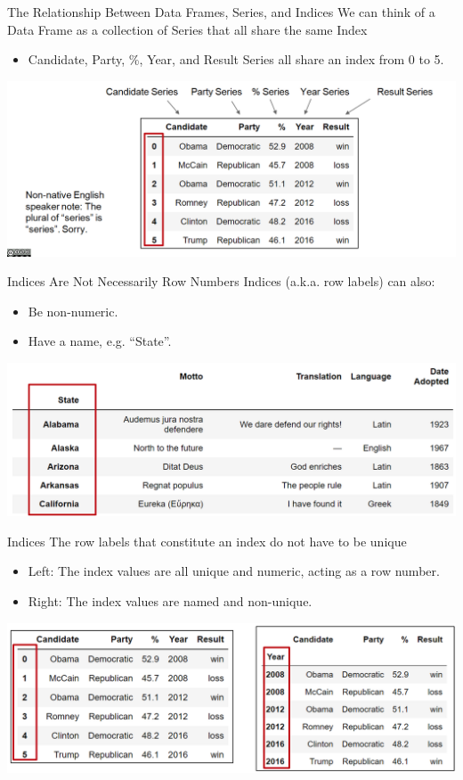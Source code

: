 \documentclass[aspectratio=169]{../latex_main/tntbeamer}  %
\begin{document}
	
	\begin{frame}{The Relationship Between Data Frames, Series, and Indices }
	   We can think of a Data Frame as a collection of Series that all share the same Index
	    \begin{itemize}
	        \item Candidate, Party, \%, Year, and Result Series all share an index from  0 to 5.
	    \end{itemize}
	    \includegraphics[scale=.39]{Bild5}
	\end{frame}
	
	
	\begin{frame}{Indices Are Not Necessarily Row Numbers}
	   Indices (a.k.a. row labels) can also:
	   \begin{itemize}
	       \item Be non-numeric.
	       \item Have a name, e.g. “State”. 
	   \end{itemize}
	    \includegraphics[scale=.39]{Bild6}
	\end{frame}
	
	
	\begin{frame}{Indices}
	   The row labels that constitute an index do not have to be unique
	   \begin{itemize}
	       \item Left: The index values are all unique and numeric, acting as a row number.
	       \item Right: The index values are named and non-unique.
	   \end{itemize}
	    \includegraphics[scale=.39]{Bild7}
	\end{frame}
	
\end{document}
